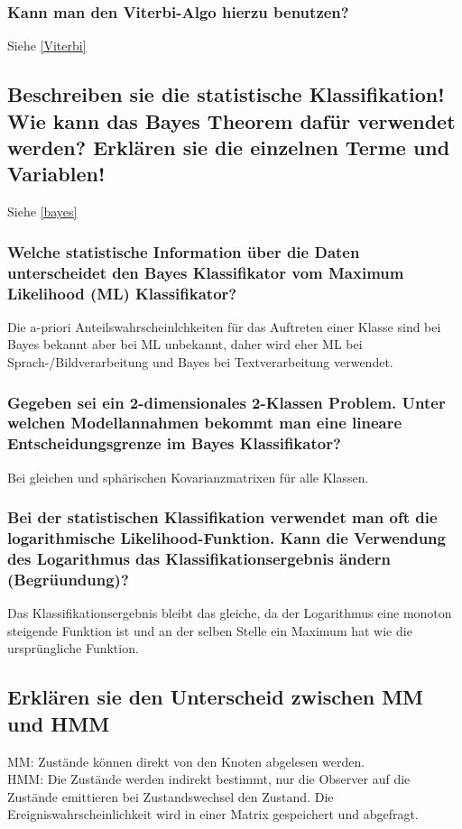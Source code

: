\documentclass[12pt]{scrartcl}
\begin{document}
\subsubsection{Kann man den Viterbi-Algo hierzu benutzen?}
Siehe \ref{Viterbi}

\subsection{Beschreiben sie die statistische Klassifikation! Wie kann das Bayes Theorem dafür verwendet werden? Erklären sie die einzelnen Terme und Variablen!}
Siehe \ref{bayes}

\subsubsection{Welche statistische Information über die Daten unterscheidet den Bayes Klassifikator vom Maximum Likelihood (ML) Klassifikator?}
Die a-priori Anteilswahrscheinlchkeiten für das Auftreten einer Klasse sind bei Bayes bekannt aber bei ML unbekannt, daher wird eher ML bei Sprach-/Bildverarbeitung und Bayes bei Textverarbeitung verwendet.

\subsubsection{Gegeben sei ein 2-dimensionales 2-Klassen Problem. Unter welchen Modellannahmen bekommt man eine lineare Entscheidungsgrenze im Bayes Klassifikator?}
Bei gleichen und sphärischen Kovarianzmatrixen für alle Klassen.

\subsubsection{Bei der statistischen Klassifikation verwendet man oft die logarithmische Likelihood-Funktion. Kann die Verwendung des Logarithmus das Klassifikationsergebnis ändern (Begrüundung)?}
Das Klassifikationsergebnis bleibt das gleiche, da der Logarithmus eine monoton steigende Funktion ist und an der selben Stelle ein Maximum hat wie die ursprüngliche Funktion.

\subsection{Erklären sie den Unterscheid zwischen MM und HMM}
MM: Zustände können direkt von den Knoten abgelesen werden. \\
HMM: Die Zustände werden indirekt bestimmt, nur die Observer auf die Zustände emittieren bei Zustandswechsel den Zustand. Die Ereigniswahrscheinlichkeit wird in einer Matrix gespeichert und abgefragt.
\end{document}
